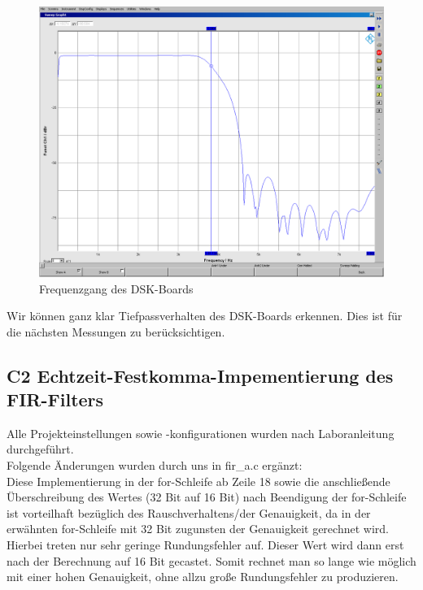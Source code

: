 \begin{figure}[h]
	\centering
	\includegraphics[width=1.0\linewidth]{Bilder/Attachment_C1_DSK_Frequenzgang}
	\caption{Frequenzgang des DSK-Boards}
	\label{fig:Attachment_C1_DSK_Frequenzgang}
\end{figure}

\noindent Wir können ganz klar Tiefpassverhalten des DSK-Boards erkennen. Dies ist für die nächsten Messungen zu berücksichtigen.

\clearpage

\subsection{C2 Echtzeit-Festkomma-Impementierung des FIR-Filters}
\noindent Alle Projekteinstellungen sowie -konfigurationen wurden nach Laboranleitung durchgeführt.\\
\noindent Folgende Änderungen wurden durch uns in fir\_a.c ergänzt: \\

\noindent Diese Implementierung in der for-Schleife ab Zeile 18 sowie die anschließende Überschreibung des Wertes (32 Bit auf 16 Bit) nach Beendigung der for-Schleife ist vorteilhaft bezüglich des Rauschverhaltens/der Genauigkeit, da in der erwähnten for-Schleife mit 32 Bit zugunsten der Genauigkeit gerechnet wird. Hierbei treten nur sehr geringe Rundungsfehler auf. Dieser Wert wird dann erst nach der Berechnung auf 16 Bit gecastet. Somit rechnet man so lange wie möglich mit einer hohen Genauigkeit, ohne allzu große Rundungsfehler zu produzieren.


